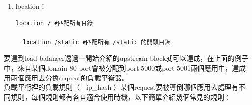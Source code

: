 \documentclass[14pt,a4paper]{report}  %
\begin{document}
\begin{enumerate}
\item location：
\begin{lstlisting}[caption=\Large\sectionef location設定]
  location / #匹配所有目錄

  location /static #匹配所有 /static 的開頭目錄
\end{lstlisting}
\end{enumerate}

 要達到load balancer透過一開始介紹的upstream block就可以達成，在上面的例子中，來自某個domain 80 port會被分配到port 5000或port 5001兩個應用中，達成用兩個應用去分擔request的負載平衡器。\\
 
 負載平衡裡的負載規則（　ip\_hash ）某個request要被導倒哪個應用去處理有不同規則，每個規則都有各自適合使用時機，以下簡單介紹幾個常見的規則：\\
\end{document}
